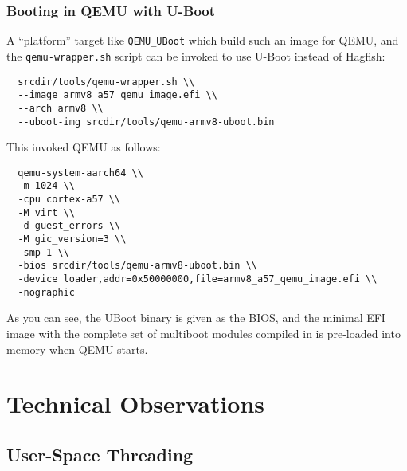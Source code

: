 \documentclass[a4paper,twoside]{report}
\def\qemu{QEMU\xspace}
\begin{document}
\subsection{Booting in \qemu with U-Boot}

A ``platform'' target like \texttt{QEMU\_UBoot} which build such an image
for \qemu, and the \texttt{qemu-wrapper.sh} script can be invoked to
use U-Boot instead of Hagfish:

\begin{lstlisting}
  srcdir/tools/qemu-wrapper.sh \\
  --image armv8_a57_qemu_image.efi \\
  --arch armv8 \\
  --uboot-img srcdir/tools/qemu-armv8-uboot.bin
\end{lstlisting}

This invoked \qemu as follows:

\begin{lstlisting}
  qemu-system-aarch64 \\
  -m 1024 \\
  -cpu cortex-a57 \\
  -M virt \\
  -d guest_errors \\
  -M gic_version=3 \\
  -smp 1 \\
  -bios srcdir/tools/qemu-armv8-uboot.bin \\
  -device loader,addr=0x50000000,file=armv8_a57_qemu_image.efi \\
  -nographic
\end{lstlisting}

As you can see, the UBoot binary is given as the BIOS, and the minimal
EFI image with the complete set of multiboot modules compiled in is
pre-loaded into memory when \qemu starts.

\chapter{Technical Observations}\label{c:tech}

\section{User-Space Threading}\label{s:threads}
\end{document}

